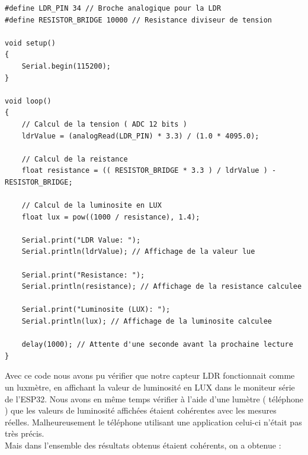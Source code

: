 \begin{lstlisting}[style=CStyle, caption={Exemple utilisation LDR}, label={lst:ldr_exemple}]
#define LDR_PIN 34 // Broche analogique pour la LDR
#define RESISTOR_BRIDGE 10000 // Resistance diviseur de tension 

void setup() 
{
    Serial.begin(115200); 
}

void loop() 
{
    // Calcul de la tension ( ADC 12 bits )
    ldrValue = (analogRead(LDR_PIN) * 3.3) / (1.0 * 4095.0);

    // Calcul de la reistance 
    float resistance = (( RESISTOR_BRIDGE * 3.3 ) / ldrValue ) - RESISTOR_BRIDGE;
    
    // Calcul de la luminosite en LUX
    float lux = pow((1000 / resistance), 1.4); 

    Serial.print("LDR Value: ");
    Serial.println(ldrValue); // Affichage de la valeur lue
    
    Serial.print("Resistance: ");
    Serial.println(resistance); // Affichage de la resistance calculee
    
    Serial.print("Luminosite (LUX): ");
    Serial.println(lux); // Affichage de la luminosite calculee

    delay(1000); // Attente d'une seconde avant la prochaine lecture
}
\end{lstlisting}

Avec ce code nous avons pu vérifier que notre capteur LDR fonctionnait comme un luxmètre,
en affichant la valeur de luminosité en LUX dans le moniteur série de l'ESP32. 
Nous avons en même temps vérifier à l'aide d'une lumètre ( téléphone ) que les valeurs de 
luminosité affichées étaient cohérentes avec les mesures réelles. Malheureusement le téléphone 
utilisant une application celui-ci n'était pas très précis.
\\

Mais dans l'ensemble des résultats obtenus étaient cohérents, on a obtenue : 
\\

